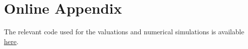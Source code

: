 \section{Online Appendix}

The relevant code used for the valuations and numerical simulations is available \href{https://github.com/djdavor/thesis_tex}{here}.